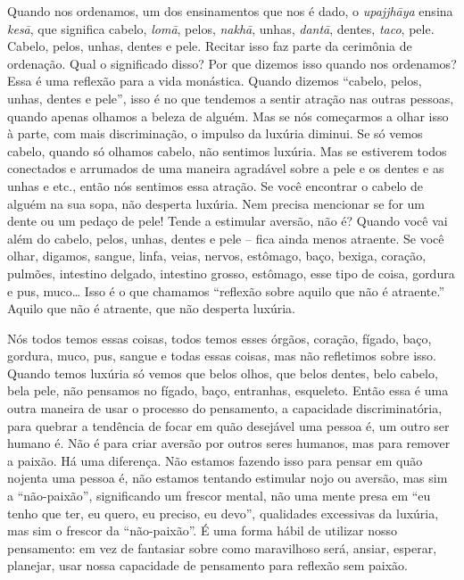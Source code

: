 Quando nos ordenamos, um dos ensinamentos que nos é dado, o
\textit{upajjh\=aya} ensina \textit{kes\=a}, que significa cabelo,
\textit{lom\=a}, pelos, \textit{nakh\=a}, unhas, \textit{dant\=a},
dentes, \textit{taco}, pele. Cabelo, pelos, unhas, dentes e pele.
Recitar isso faz parte da cerimônia de ordenação. Qual o significado
disso? Por que dizemos isso quando nos ordenamos? Essa é uma reflexão
para a vida monástica. Quando dizemos “cabelo, pelos, unhas, dentes e
pele”, isso é no que tendemos a sentir atração nas outras pessoas,
quando apenas olhamos a beleza de alguém. Mas se nós começarmos a olhar
isso à parte, com mais discriminação, o impulso da luxúria diminui. Se
só vemos cabelo, quando só olhamos cabelo, não sentimos luxúria. Mas se
estiverem todos conectados e arrumados de uma maneira agradável sobre a
pele e os dentes e as unhas e etc., então nós sentimos essa atração. Se
você encontrar o cabelo de alguém na sua sopa, não desperta luxúria.
Nem precisa mencionar se for um dente ou um pedaço de pele! Tende a
estimular aversão, não é? Quando você vai além do cabelo, pelos, unhas,
dentes e pele – fica ainda menos atraente. Se você olhar, digamos,
sangue, linfa, veias, nervos, estômago, baço, bexiga, coração, pulmões,
intestino delgado, intestino grosso, estômago, esse tipo de coisa,
gordura e pus, muco… Isso é o que chamamos “reflexão sobre aquilo que
não é atraente.” Aquilo que não é atraente, que não desperta luxúria. 

Nós todos temos essas coisas, todos temos esses órgãos, coração,
fígado, baço, gordura, muco, pus, sangue e todas essas coisas, mas não
refletimos sobre isso. Quando temos luxúria só vemos que belos olhos,
que belos dentes, belo cabelo, bela pele, não pensamos no fígado, baço,
entranhas, esqueleto. Então essa é uma outra maneira de usar o processo
do pensamento, a capacidade discriminatória, para quebrar a tendência
de focar em quão desejável uma pessoa é, um outro ser humano é. Não é
para criar aversão por outros seres humanos, mas para remover a paixão.
Há uma diferença. Não estamos fazendo isso para pensar em quão nojenta
uma pessoa é, não estamos tentando estimular nojo ou aversão, mas sim a
“não-paixão”, significando um frescor mental, não uma mente presa em
“eu tenho que ter, eu quero, eu preciso, eu devo”, qualidades
excessivas da luxúria, mas sim o frescor da “não-paixão”. É uma forma
hábil de utilizar nosso pensamento: em vez de fantasiar sobre como
maravilhoso será, ansiar, esperar, planejar, usar nossa capacidade de
pensamento para reflexão sem paixão. 

